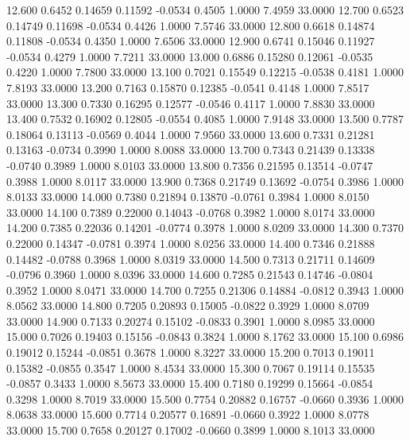   12.600   0.6452   0.14659   0.11592  -0.0534   0.4505   1.0000   7.4959  33.0000
  12.700   0.6523   0.14749   0.11698  -0.0534   0.4426   1.0000   7.5746  33.0000
  12.800   0.6618   0.14874   0.11808  -0.0534   0.4350   1.0000   7.6506  33.0000
  12.900   0.6741   0.15046   0.11927  -0.0534   0.4279   1.0000   7.7211  33.0000
  13.000   0.6886   0.15280   0.12061  -0.0535   0.4220   1.0000   7.7800  33.0000
  13.100   0.7021   0.15549   0.12215  -0.0538   0.4181   1.0000   7.8193  33.0000
  13.200   0.7163   0.15870   0.12385  -0.0541   0.4148   1.0000   7.8517  33.0000
  13.300   0.7330   0.16295   0.12577  -0.0546   0.4117   1.0000   7.8830  33.0000
  13.400   0.7532   0.16902   0.12805  -0.0554   0.4085   1.0000   7.9148  33.0000
  13.500   0.7787   0.18064   0.13113  -0.0569   0.4044   1.0000   7.9560  33.0000
  13.600   0.7331   0.21281   0.13163  -0.0734   0.3990   1.0000   8.0088  33.0000
  13.700   0.7343   0.21439   0.13338  -0.0740   0.3989   1.0000   8.0103  33.0000
  13.800   0.7356   0.21595   0.13514  -0.0747   0.3988   1.0000   8.0117  33.0000
  13.900   0.7368   0.21749   0.13692  -0.0754   0.3986   1.0000   8.0133  33.0000
  14.000   0.7380   0.21894   0.13870  -0.0761   0.3984   1.0000   8.0150  33.0000
  14.100   0.7389   0.22000   0.14043  -0.0768   0.3982   1.0000   8.0174  33.0000
  14.200   0.7385   0.22036   0.14201  -0.0774   0.3978   1.0000   8.0209  33.0000
  14.300   0.7370   0.22000   0.14347  -0.0781   0.3974   1.0000   8.0256  33.0000
  14.400   0.7346   0.21888   0.14482  -0.0788   0.3968   1.0000   8.0319  33.0000
  14.500   0.7313   0.21711   0.14609  -0.0796   0.3960   1.0000   8.0396  33.0000
  14.600   0.7285   0.21543   0.14746  -0.0804   0.3952   1.0000   8.0471  33.0000
  14.700   0.7255   0.21306   0.14884  -0.0812   0.3943   1.0000   8.0562  33.0000
  14.800   0.7205   0.20893   0.15005  -0.0822   0.3929   1.0000   8.0709  33.0000
  14.900   0.7133   0.20274   0.15102  -0.0833   0.3901   1.0000   8.0985  33.0000
  15.000   0.7026   0.19403   0.15156  -0.0843   0.3824   1.0000   8.1762  33.0000
  15.100   0.6986   0.19012   0.15244  -0.0851   0.3678   1.0000   8.3227  33.0000
  15.200   0.7013   0.19011   0.15382  -0.0855   0.3547   1.0000   8.4534  33.0000
  15.300   0.7067   0.19114   0.15535  -0.0857   0.3433   1.0000   8.5673  33.0000
  15.400   0.7180   0.19299   0.15664  -0.0854   0.3298   1.0000   8.7019  33.0000
  15.500   0.7754   0.20882   0.16757  -0.0660   0.3936   1.0000   8.0638  33.0000
  15.600   0.7714   0.20577   0.16891  -0.0660   0.3922   1.0000   8.0778  33.0000
  15.700   0.7658   0.20127   0.17002  -0.0660   0.3899   1.0000   8.1013  33.0000
